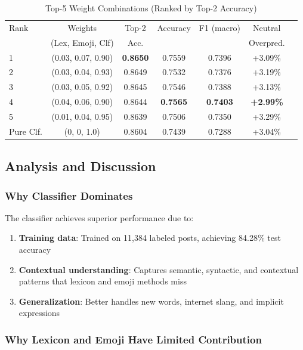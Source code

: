 \begin{table}[h]
\centering
\caption{Top-5 Weight Combinations (Ranked by Top-2 Accuracy)}
\label{tab:top_combinations}
\begin{tabular}{lcccccc}
\toprule
Rank & Weights & Top-2 & Accuracy & F1 (macro) & Neutral \\
    & (Lex, Emoji, Clf) & Acc. & & & Overpred. \\
\midrule
1 & (0.03, 0.07, 0.90) & \textbf{0.8650} & 0.7559 & 0.7396 & +3.09\% \\
2 & (0.03, 0.04, 0.93) & 0.8649 & 0.7532 & 0.7376 & +3.19\% \\
3 & (0.03, 0.05, 0.92) & 0.8645 & 0.7546 & 0.7388 & +3.13\% \\
4 & (0.04, 0.06, 0.90) & 0.8644 & \textbf{0.7565} & \textbf{0.7403} & \textbf{+2.99\%} \\
5 & (0.01, 0.04, 0.95) & 0.8639 & 0.7506 & 0.7350 & +3.29\% \\
\midrule
Pure Clf. & (0, 0, 1.0) & 0.8604 & 0.7439 & 0.7288 & +3.04\% \\
\bottomrule
\end{tabular}
\end{table}

\subsection{Analysis and Discussion}
\label{subsec:analysis}

\subsubsection{Why Classifier Dominates}

The classifier achieves superior performance due to:
\begin{enumerate}
    \item \textbf{Training data}: Trained on 11,384 labeled posts, achieving 84.28\% test accuracy
    \item \textbf{Contextual understanding}: Captures semantic, syntactic, and contextual patterns that lexicon and emoji methods miss
    \item \textbf{Generalization}: Better handles new words, internet slang, and implicit expressions
\end{enumerate}

\subsubsection{Why Lexicon and Emoji Have Limited Contribution}

